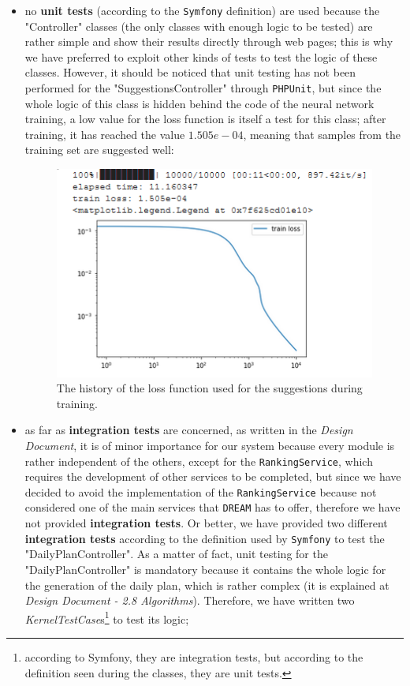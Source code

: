 \documentclass{article}
\begin{document}
\begin{itemize}
    \item no \textbf{unit tests} (according to the \verb|Symfony| definition) are used because the "Controller" classes (the only classes with enough logic to be tested) are rather simple and show their results directly through web pages; this is why we have preferred to exploit other kinds of tests to test the logic of these classes. However, it should be noticed that unit testing has not been performed for the "SuggestionsController" through \verb|PHPUnit|, but since the whole logic of this class is hidden behind the code of the neural network training, a low value for the loss function is itself a test for this class; after training, it has reached the value $1.505e-04$, meaning that samples from the training set are suggested well:
    \begin{figure}[H]
        \centering
        \includegraphics{loss_history_training.png}
        \caption{The history of the loss function used for the suggestions during training.}
        \label{fig:loss}
    \end{figure}
    \item as far as \textbf{integration tests} are concerned, as written in the \textit{Design Document}, it is of minor importance for our system because every module is rather independent of the others, except for the \verb|RankingService|, which requires the development of other services to be completed, but since we have decided to avoid the implementation of the \verb|RankingService| because not considered one of the main services that \verb|DREAM| has to offer, therefore we have not provided \textbf{integration tests}. Or better, we have provided two different \textbf{integration tests} according to the definition used by \verb|Symfony| to test the "DailyPlanController". As a matter of fact, unit testing for the "DailyPlanController" is mandatory because it contains the whole logic for the generation of the daily plan, which is rather complex (it is explained at \textit{Design Document - 2.8 Algorithms}). Therefore, we have written two \textit{KernelTestCase}s\footnote{according to Symfony, they are integration tests, but according to the definition seen during the classes, they are unit tests.} to test its logic;

\end{itemize}
\end{document}
